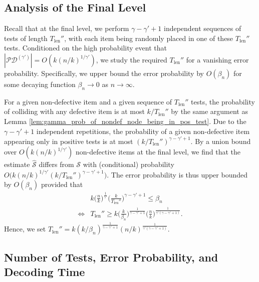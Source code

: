\subsection{Analysis of the Final Level} \label{sec:gamma_final_lvl_analysis}

Recall that at the final level, we perform $\gamma-\gamma'+1$ independent sequences of tests of length $T_{\text{len}}''$, with each item being randomly placed in one of these $T_{\text{len}}''$ tests. Conditioned on the high probability event that $|\mathcal{PD}^{(\gamma')}|=O(k(n/k)^{1/\gamma'})$, we study the required $T_{\text{len}}''$ for a vanishing error probability. Specifically, we upper bound the error probability by $O(\beta_n)$ for some decaying function $\beta_n\rightarrow0$ as $n\rightarrow\infty$. 

For a given non-defective item and a given sequence of $T_{\text{len}}''$ tests, the probability of colliding with any defective item is at most $k/T_{\text{len}}''$ by the same argument as Lemma \ref{lem:gamma_prob_of_nondef_node_being_in_pos_test}. Due to the $\gamma-\gamma'+1$ independent repetitions, the probability of a given non-defective item appearing only in positive tests is at most $(k/T_{\text{len}}'')^{\gamma-\gamma'+1}$. By a union bound over $O(k(n/k)^{1/\gamma'})$ non-defective items at the final level, we find that the estimate $\widehat{\mathcal{S}}$ differs from $\mathcal{S}$ with (conditional) probability $O\big(k(n/k)^{1/\gamma'}(k/T_{\text{len}}'')^{\gamma-\gamma'+1}\big)$. The error probability is thus upper bounded by $O(\beta_n)$ provided that
\begin{align}
    &k\Big(\frac{n}{k}\Big)^{\frac{1}{\gamma'}}\Big(\frac{k}{T_{\text{len}}''}\Big)^{\gamma-\gamma'+1}\leq\beta_n \\
    \iff &T_{\text{len}}''\geq k\Big(\frac{k}{\beta_n}\Big)^{\frac{1}{\gamma-\gamma'+1}}\Big(\frac{n}{k}\Big)^{\frac{1}{\gamma'(\gamma-\gamma'+1)}}.
\end{align}
Hence, we set $T_{\text{len}}''=k(k/\beta_n)^{\frac{1}{\gamma-\gamma'+1}}(n/k)^{\frac{1}{\gamma'(\gamma-\gamma'+1)}}$.

\subsection{Number of Tests, Error Probability, and Decoding Time}

